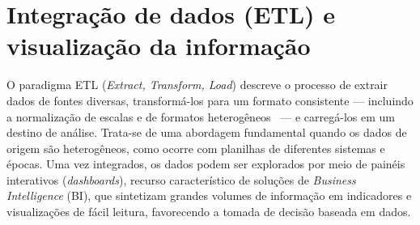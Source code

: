 \section{Integração de dados (ETL) e visualização da informação}

O paradigma ETL (\textit{Extract, Transform, Load}) descreve o processo de
extrair dados de fontes diversas, transformá-los para um formato consistente ---
incluindo a normalização de escalas e de formatos
heterogêneos~\cite{sinsomboonthong2022performance} --- e carregá-los em um destino
de análise. Trata-se de uma abordagem fundamental
quando os dados de origem são heterogêneos, como ocorre com planilhas de
diferentes sistemas e épocas. Uma vez integrados, os dados podem ser explorados
por meio de painéis interativos (\textit{dashboards}), recurso característico de
soluções de \textit{Business Intelligence} (BI), que sintetizam grandes volumes
de informação em indicadores e visualizações de fácil leitura, favorecendo a
tomada de decisão baseada em dados.
